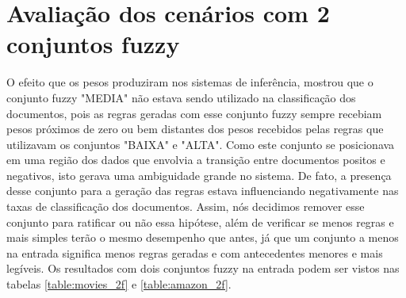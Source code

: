 \documentclass[template.tex]{subfiles}
\begin{document}
\section{Avaliação dos cenários com 2 conjuntos fuzzy}

O efeito que os pesos produziram nos sistemas de inferência, mostrou que o conjunto fuzzy "MEDIA" não estava sendo utilizado na classificação dos documentos, pois as regras geradas com esse conjunto fuzzy sempre recebiam pesos próximos de zero ou bem distantes dos pesos recebidos pelas regras que utilizavam os conjuntos "BAIXA" e "ALTA". Como este conjunto se posicionava em uma região dos dados que envolvia a transição entre documentos positos e negativos, isto gerava uma ambiguidade grande no sistema. De fato, a presença desse conjunto para a geração das regras estava influenciando negativamente nas taxas de classificação dos documentos. Assim, nós decidimos remover esse conjunto para ratificar ou não essa hipótese, além de verificar se menos regras e mais simples terão o mesmo desempenho que antes, já que um conjunto a menos na entrada significa menos regras geradas e com antecedentes menores e mais legíveis. Os resultados com dois conjuntos fuzzy na entrada podem ser vistos nas tabelas \ref{table:movies_2f} e \ref{table:amazon_2f}.
\end{document}
